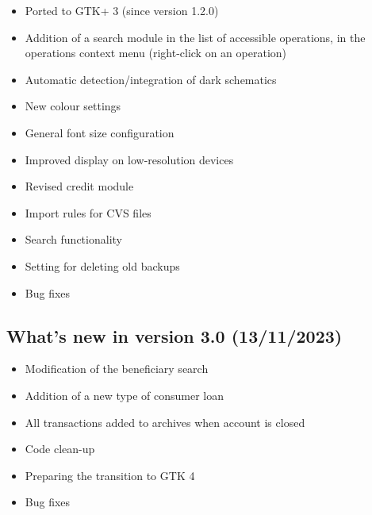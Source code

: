 \begin{itemize}
	\item Ported to \gls{GTK}+ 3 (since version 1.2.0)%
	\item Addition of a search module in the list of accessible operations, in the operations context menu (right-click on an operation)%
	\item Automatic detection/integration of dark schematics%
	\item New colour settings%
	\item General font size configuration%
	\item Improved display on low-resolution devices%
	\item Revised credit module%
	\item Import rules for \gls{CVS} files%
	\item Search functionality%
	\item Setting for deleting old backups%
	\item Bug fixes%
\end{itemize}

\subsection{What's new in version 3.0 \textnormal{(13/11/2023)}}

\begin{itemize}
	\item Modification of the beneficiary search%
	\item Addition of a new type of consumer loan%
	\item All transactions added to archives when account is closed%
	\item Code clean-up%
	\item Preparing the transition to \gls{GTK} 4%
	\item Bug fixes%
\end{itemize}

